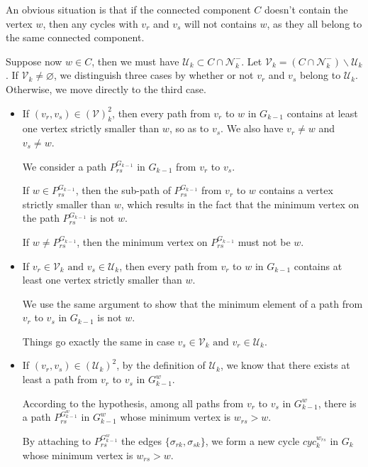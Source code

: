\documentclass[a4paper,12pt]{article}
\numberwithin{equation}{section}
\begin{document}
	An obvious situation is that if the connected component $C$ doesn't contain the vertex $w$, then any cycles with $v_r$ and $v_s$ will not contains $w$, as they all belong to the same connected component.
	
	Suppose now $w \in C$, then we must have $\mathcal{U}_k \subset C \cap \mathcal{N}_k^-$. Let $\mathcal{V}_k = (C \cap \mathcal{N}_k^-) \backslash \mathcal{U}_k$. If $\mathcal{V}_k \neq \varnothing$, we distinguish three cases by whether or not $v_r$ and $v_s$ belong to $\mathcal{U}_k$. Otherwise, we move directly to the third case.
	    \begin{itemize}
	    	\item If $(v_r,v_s) \in (\mathcal{V})^2_k$, then every path from $v_r$ to $w$ in $G_{k-1}$ contains at least one vertex strictly smaller than $w$, so as to $v_s$. We also have $v_r \neq w$ and $v_s \neq w$.
	    	
	    	We consider a path $P_{rs}^{G_{k-1}}$ in $G_{k-1}$ from $v_r$ to $v_s$.
	    	
	    	If $w \in P_{rs}^{G_{k-1}}$, then the sub-path of $P_{rs}^{G_{k-1}}$ from $v_r$ to $w$ contains a vertex strictly smaller than $w$, which results in the fact that the minimum vertex on the path $P_{rs}^{G_{k-1}}$ is not $w$.
	    	
		    If $w \neq P_{rs}^{G_{k-1}}$, then the minimum vertex on $P_{rs}^{G_{k-1}}$ must not be $w$.
		    
		    \item If $v_r \in \mathcal{V}_k \text{ and } v_s \in \mathcal{U}_k$, then every path from $v_r$ to $w$ in $G_{k-1}$ contains at least one vertex strictly smaller than $w$.
		    
		    We use the same argument to show that the minimum element of a path from $v_r$ to $v_s$ in $G_{k-1}$ is not $w$.
		    
		    Things go exactly the same in case $v_s \in \mathcal{V}_k \text{ and } v_r \in \mathcal{U}_k$. 

			
			\item If $(v_r, v_s) \in (\mathcal{U}_k)^2$, by the definition of $\mathcal{U}_k$, we know that there exists at least a path from $v_r$ to $v_s$ in $G_{k-1}^w$.
			
			According to the hypothesis, among all paths from $v_r$ to $v_s$ in $G^w_{k-1}$, there is a path $P_{rs}^{G^w_{k-1}}$ in $G_{k-1}^w$ whose minimum vertex is $w_{rs} > w$.
			
			By attaching to $P_{rs}^{G^w_{k-1}}$ the edges $\{\sigma_{rk}, \sigma_{sk} \}$, we form a new cycle $cyc_k^{w_{rs}}$ in $G_{k}$ whose minimum vertex is $w_{rs} > w$. 
			

\end{itemize}
\end{document}

